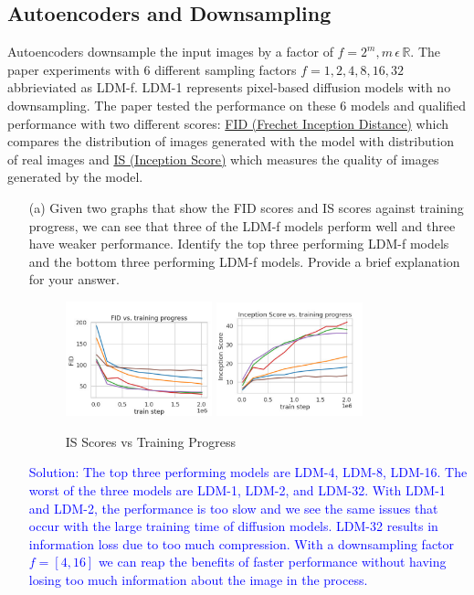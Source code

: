 \documentclass[a4paper]{article}
\begin{document}
\subsection{Autoencoders and Downsampling}
Autoencoders downsample the input images by a factor of \(f=2^m, m  \, \epsilon \, \mathbb{R}\). The paper experiments with 6 different sampling factors \(f={1, 2, 4, 8, 16, 32}\) abbrieviated as LDM-f. LDM-1 represents pixel-based diffusion models with no downsampling. The paper tested the performance on these 6 models and qualified performance with two different scores: \href{https://en.wikipedia.org/wiki/Fr%C3%A9chet_inception_distance}{FID (Frechet Inception Distance)} which compares the distribution of images generated with the model with distribution of real images and \href{https://en.wikipedia.org/wiki/Inception_score}{IS (Inception Score)} which measures the quality of images generated by the model.
\begin{itemize}
    \item [(a)]
    Given two graphs that show the FID scores and IS scores against training progress, we can see that three of the LDM-f models perform well and three have weaker performance. Identify the top three performing LDM-f models and the bottom three performing LDM-f models. Provide a brief explanation for your answer.

     \begin{figure}[htbp]
        \centering
        \includegraphics[width=0.4\textwidth]{fid_scores.png} \hfill
        \includegraphics[width=0.4\textwidth]{is_scores.png}
        \caption{IS Scores vs Training Progress}
        \label{fig:is}
    \end{figure}

     \textcolor{blue}{Solution: The top three performing models are LDM-4, LDM-8, LDM-16. The worst of the three models are LDM-1, LDM-2, and LDM-32. With LDM-1 and LDM-2, the performance is too slow and we see the same issues that occur with the large training time of diffusion models. LDM-32 results in information loss due to too much compression. With a downsampling factor \(f = [4, 16]\) we can reap the benefits of faster performance without having losing too much information about the image in the process.}
     
     
\end{itemize}
\end{document}

